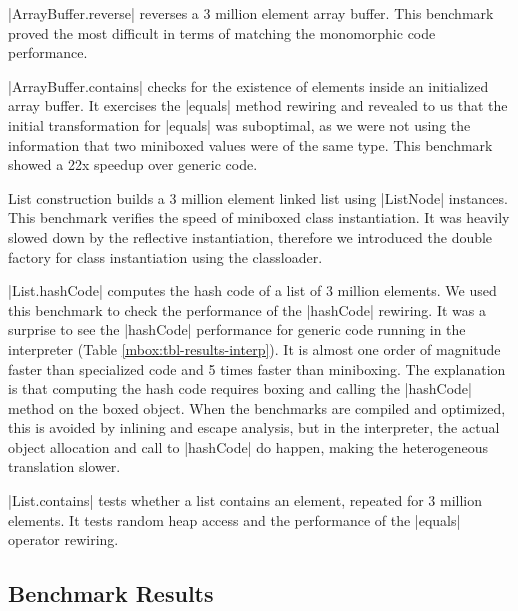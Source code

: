 |ArrayBuffer.reverse| reverses a 3 million element array buffer. This benchmark proved the most difficult in terms of matching the monomorphic code performance.

|ArrayBuffer.contains| checks for the existence of elements inside an initialized array buffer. It exercises the |equals| method rewiring and revealed to us that the initial transformation for |equals| was suboptimal, as we were not using the information that two miniboxed values were of the same type. This benchmark showed a 22x speedup over generic code.

List construction builds a 3 million element linked list using |ListNode| instances. This benchmark verifies the speed of miniboxed class instantiation. It was heavily slowed down by the reflective instantiation, therefore we introduced the double factory for class instantiation using the classloader.

|List.hashCode| computes the hash code of a list of 3 million elements. We used this benchmark to check the performance of the |hashCode| rewiring. It was a surprise to see the |hashCode| performance for generic code running in the interpreter (Table \ref{mbox:tbl-results-interp}). It is almost one order of magnitude faster than specialized code and 5 times faster than miniboxing. The explanation is that computing the hash code requires boxing and calling the |hashCode| method on the boxed object. When the benchmarks are compiled and optimized, this is avoided by inlining and escape analysis, but in the interpreter, the actual object allocation and call to |hashCode| do happen, making the heterogeneous translation slower.

|List.contains| tests whether a list contains an element, repeated for 3 million elements. It tests random heap access and the performance of the |equals| operator rewiring.

\subsection{Benchmark Results}
\label{mbox:subsec-eval-results}

